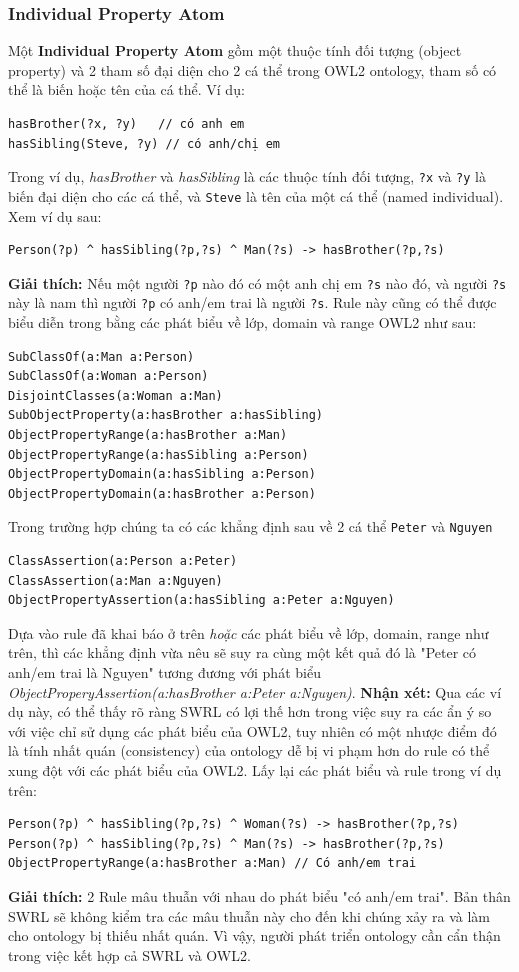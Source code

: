 \subsubsection{Individual Property Atom}
Một \textbf{Individual Property Atom} gồm một thuộc tính đối tượng (object property) và 2 tham số đại diện cho 2 cá thể trong OWL2 ontology, tham số có thể là biến hoặc tên của cá thể. Ví dụ:
\begin{verbatim}
hasBrother(?x, ?y)   // có anh em
hasSibling(Steve, ?y) // có anh/chị em 
\end{verbatim}
Trong ví dụ, \textit{hasBrother} và \textit{hasSibling} là các thuộc tính đối tượng, \verb|?x| và \verb|?y| là biến đại diện cho các cá thể, và \verb|Steve| là tên của một cá thể (named individual). Xem ví dụ sau:
\begin{verbatim}
Person(?p) ^ hasSibling(?p,?s) ^ Man(?s) -> hasBrother(?p,?s)
\end{verbatim}
\textbf{Giải thích:} Nếu một người \verb|?p| nào đó có một anh chị em \verb|?s| nào đó, và người \verb|?s| này là nam thì người \verb|?p| có anh/em trai là người \verb|?s|. Rule này cũng có thể được biểu diễn trong bằng các phát biểu về lớp, domain và range OWL2 như sau:
\begin{verbatim}
SubClassOf(a:Man a:Person)
SubClassOf(a:Woman a:Person)
DisjointClasses(a:Woman a:Man)
SubObjectProperty(a:hasBrother a:hasSibling)
ObjectPropertyRange(a:hasBrother a:Man)
ObjectPropertyRange(a:hasSibling a:Person)
ObjectPropertyDomain(a:hasSibling a:Person)
ObjectPropertyDomain(a:hasBrother a:Person)
\end{verbatim}
Trong trường hợp chúng ta có các khẳng định sau về 2 cá thể \verb|Peter| và \verb|Nguyen|
\begin{verbatim}
ClassAssertion(a:Person a:Peter)
ClassAssertion(a:Man a:Nguyen)
ObjectPropertyAssertion(a:hasSibling a:Peter a:Nguyen)
\end{verbatim}
Dựa vào rule đã khai báo ở trên \textit{hoặc} các phát biểu về lớp, domain, range như trên, thì các khẳng định vừa nêu sẽ suy ra cùng một kết quả đó là "Peter có anh/em trai là Nguyen" tương đương với phát biểu \textit{ObjectProperyAssertion(a:hasBrother a:Peter a:Nguyen)}.
\textbf{Nhận xét:} Qua các ví dụ này, có thể thấy rõ ràng SWRL có lợi thế hơn trong việc suy ra các ẩn ý so với việc chỉ sử dụng các phát biểu của OWL2, tuy nhiên có một nhược điểm đó là tính nhất quán (consistency) của ontology dễ bị vi phạm hơn do rule có thể xung đột với các phát biểu của OWL2. Lấy lại các phát biểu và rule trong ví dụ trên:
\begin{verbatim}
Person(?p) ^ hasSibling(?p,?s) ^ Woman(?s) -> hasBrother(?p,?s)
Person(?p) ^ hasSibling(?p,?s) ^ Man(?s) -> hasBrother(?p,?s)
ObjectPropertyRange(a:hasBrother a:Man) // Có anh/em trai
\end{verbatim}
\textbf{Giải thích:} 2 Rule mâu thuẫn với nhau do phát biểu "có anh/em trai". Bản thân SWRL sẽ không kiểm tra các mâu thuẫn này cho đến khi chúng xảy ra và làm cho ontology bị thiếu nhất quán. Vì vậy, người phát triển ontology cần cẩn thận trong việc kết hợp cả SWRL và OWL2.

